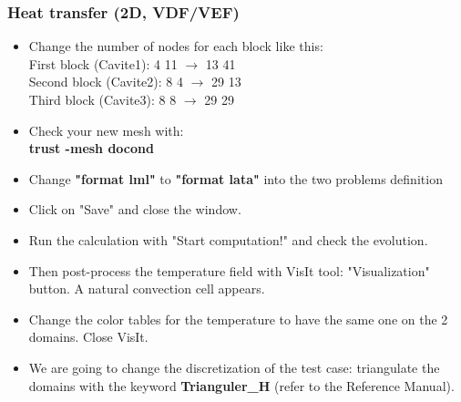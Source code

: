\documentclass[10pt, hyperref={unicode=true,pdfusetitle, bookmarks=true,bookmarksnumbered=false,bookmarksopen=false, breaklinks=false,pdfborder={0 0 1},backref=true,colorlinks=true,linkcolor=darkblue,pageanchor}]{beamer}
\begin{document}
\begin{frame}
\frametitle{Heat transfer (2D, VDF/VEF)}
\begin{block}{}

\begin{itemize}
\item Change the number of nodes for each block like this:\\
First block (Cavite1): 4 11 $\rightarrow$ 13 41 \\
Second block (Cavite2): 8 4 $\rightarrow$ 29 13 \\ 
Third block (Cavite3): 8 8  $\rightarrow$ 29 29 \\

\item Check your new mesh with:\\
\textbf{trust -mesh docond } \\

\item Change \textbf{"format lml"} to \textbf{"format lata"} into the two problems definition
\item Click on "Save" and close the window.

\item Run the calculation with "Start computation!" and check the evolution.

\item Then post-process the temperature field with VisIt tool: "Visualization" button. A natural convection cell appears.

\item Change the color tables for the temperature to have the same one on the 2 domains. Close VisIt.

\item We are going to change the discretization of the test case: triangulate the domains with the keyword \textbf{Trianguler\_H} (refer to the Reference Manual).
\end{itemize}

\end{block}
\end{frame}
\end{document}
